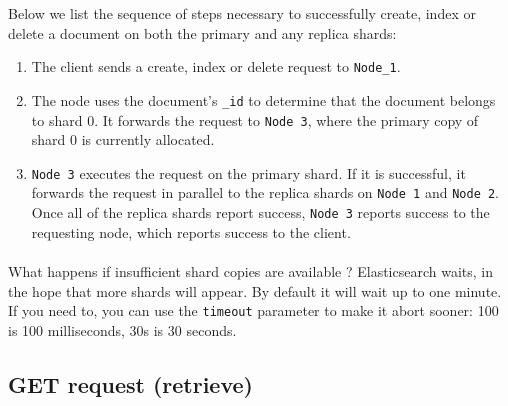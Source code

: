 \documentclass{article}%
\begin{document}
Below we list the sequence of steps necessary to successfully create, index or delete a document on both the primary and any replica shards:

\begin{enumerate}
	\item The client sends a create, index or delete request to \texttt{Node\_1}.
	\item The node uses the document’s \texttt{\_id} to determine that the document belongs to shard 0. It forwards the request to \texttt{Node 3}, where the primary copy of shard 0 is currently allocated. 
	\item \texttt{Node 3} executes the request on the primary shard. If it is successful, it forwards the request in parallel to the replica shards on \texttt{Node 1} and \texttt{Node 2}. Once all of the replica shards report success, \texttt{Node 3} reports success to the requesting node, which reports success to the client. 
\end{enumerate}

\paragraph{} What happens if insufficient shard copies are available ? Elasticsearch waits, in the hope that more shards will appear. By default it will wait up to one minute. If you need to, you can use the \texttt{timeout} parameter to make it abort sooner: 100 is 100 milliseconds, 30s is 30 seconds.

\subsection{GET request (retrieve)}
\end{document}
